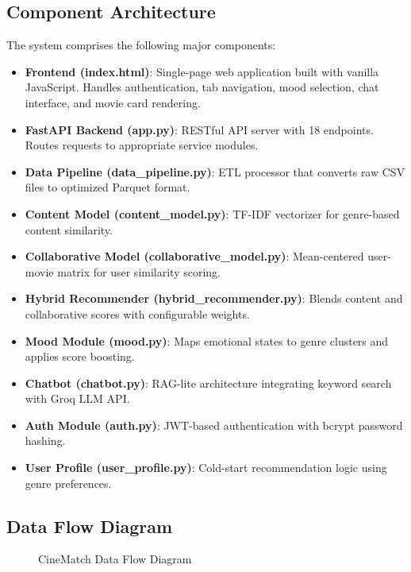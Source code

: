 \documentclass[12pt,a4paper]{report}
\begin{document}
\subsection{Component Architecture}

The system comprises the following major components:

\begin{itemize}
    \item \textbf{Frontend (index.html)}: Single-page web application built with vanilla JavaScript. Handles authentication, tab navigation, mood selection, chat interface, and movie card rendering.
    \item \textbf{FastAPI Backend (app.py)}: RESTful API server with 18 endpoints. Routes requests to appropriate service modules.
    \item \textbf{Data Pipeline (data\_pipeline.py)}: ETL processor that converts raw CSV files to optimized Parquet format.
    \item \textbf{Content Model (content\_model.py)}: TF-IDF vectorizer for genre-based content similarity.
    \item \textbf{Collaborative Model (collaborative\_model.py)}: Mean-centered user-movie matrix for user similarity scoring.
    \item \textbf{Hybrid Recommender (hybrid\_recommender.py)}: Blends content and collaborative scores with configurable weights.
    \item \textbf{Mood Module (mood.py)}: Maps emotional states to genre clusters and applies score boosting.
    \item \textbf{Chatbot (chatbot.py)}: RAG-lite architecture integrating keyword search with Groq LLM API.
    \item \textbf{Auth Module (auth.py)}: JWT-based authentication with bcrypt password hashing.
    \item \textbf{User Profile (user\_profile.py)}: Cold-start recommendation logic using genre preferences.
\end{itemize}

\subsection{Data Flow Diagram}

\begin{figure}[H]
\centering
{}
\caption{CineMatch Data Flow Diagram}
\label{fig:dfd}
\end{figure}
\end{document}
